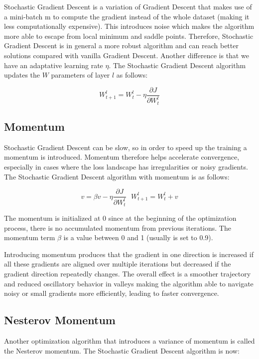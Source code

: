 Stochastic Gradient Descent is a variation of Gradient Descent that makes use of a mini-batch m to compute the gradient instead of the whole dataset (making it less computationally expensive). This introduces noise which makes the algorithm more able to escape from local minimum and saddle points. Therefore, Stochastic Gradient Descent is in general a more robust algorithm and can reach better solutions compared with vanilla Gradient Descent. Another difference is that we have an adaptative learning rate $\eta$. The Stochastic Gradient Descent algorithm updates the $W$ parameters of layer $l$ as follows:

$$ W_{t+1}^{l} = W_{t}^{l} - \eta \frac{\partial J}{\partial W_{t}^{l}} $$

\subsection{Momentum}

Stochastic Gradient Descent can be slow, so in order to speed up the training a momentum is introduced. Momentum therefore helps accelerate convergence, especially in cases where the loss landscape has irregularities or noisy gradients. The Stochastic Gradient Descent algorithm with momentum is as follows:

$$ v = \beta v - \eta \frac{\partial J}{\partial W_{t}^{l}}  ~~~  W_{t+1}^{l} = W_{t}^{l} + v $$

\noindent The momentum is initialized at 0 since at the beginning of the optimization process, there is no accumulated momentum from previous iterations. The momentum term $\beta$ is a value between 0 and 1 (usually is set to 0.9). 

Introducing momentum produces that the gradient in one direction is increased if all these gradients are aligned over multiple iterations but decreased if the gradient direction repeatedly changes. The overall effect is a smoother trajectory and reduced oscillatory behavior in valleys making the algorithm able to navigate noisy or small gradients more efficiently, leading to faster convergence.

\subsection{Nesterov Momentum}

Another optimization algorithm that introduces a variance of momentum is called the Nesterov momentum. The Stochastic Gradient Descent algorithm is now:

